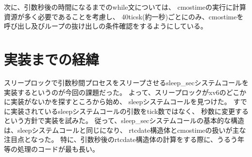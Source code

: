 \documentclass[a4j,11pt]{jarticle}
\begin{document}
次に、引数秒後の時間になるまでのwhile文については、
cmostimeの実行に計算資源が多く必要であることを考慮し、
40ticsk(約一秒)ごとにのみ、cmostimeを呼び出し及びループの抜け出しの条件確認をするようにしている。

\section{実装までの経緯}

スリープロックで引数秒間プロセスをスリープさせるsleep\_secシステムコールを
実装するというのが今回の課題だった。
よって、スリープロックがxv6のどこかに実装がないかを探すところから始め、
sleepシステムコールを見つけた。
すでに実装されているsleepシステムコールの引数をtick数ではなく、
秒数に変更するという方針で実装を試みた。
従って、sleep\_secシステムコールの基本的な構造は、sleepシステムコールと同じになり、
rtcdate構造体とcmostimeの扱いが主な注目点となった。
特に、引数秒後のrtcdate構造体の計算をする際に、うるう年等の処理のコードが最も長い。
\end{document}
